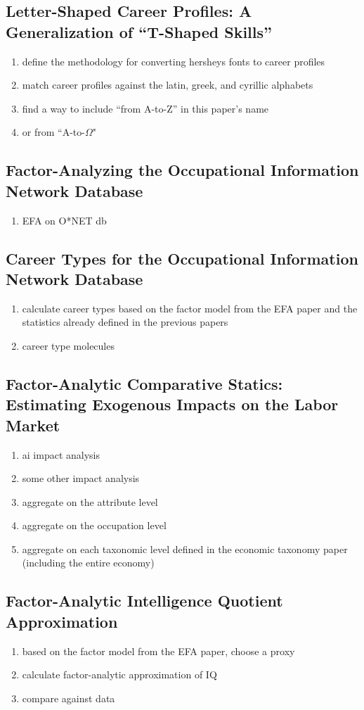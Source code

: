 \documentclass{elsarticle} %
\begin{document}
\subsection{Letter-Shaped Career Profiles: A Generalization of ``T-Shaped Skills''}
\begin{enumerate}
    \item define the methodology for converting hersheys fonts to career profiles
    \item match career profiles against the latin, greek, and cyrillic alphabets
    \item find a way to include ``from A-to-Z'' in this paper's name
    \item or from ``A-to-$\Omega$"
\end{enumerate}

\subsection{Factor-Analyzing the Occupational Information Network Database}
\begin{enumerate}
    \item EFA on O*NET db
\end{enumerate}

\subsection{Career Types for the Occupational Information Network Database}
\begin{enumerate}
    \item calculate career types based on the factor model from the EFA paper and the
          statistics already defined in the previous papers
    \item career type molecules
\end{enumerate}

\subsection{Factor-Analytic Comparative Statics: Estimating Exogenous Impacts on the Labor Market}
\begin{enumerate}
    \item ai impact analysis
    \item some other impact analysis
    \item aggregate on the attribute level
    \item aggregate on the occupation level
    \item aggregate on each taxonomic level defined in the economic taxonomy paper
          (including the entire economy)
\end{enumerate}

\subsection{Factor-Analytic Intelligence Quotient Approximation}
\begin{enumerate}
    \item based on the factor model from the EFA paper, choose a proxy
    \item calculate factor-analytic approximation of IQ
    \item compare against data
\end{enumerate}
\end{document}
